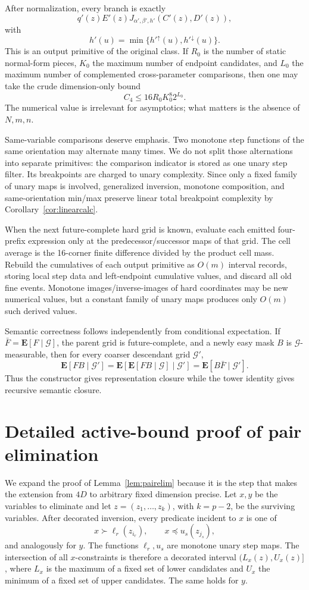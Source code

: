 \documentclass[12pt,a4paper]{article}
\theoremstyle{definition}
\newcommand{\E}{\mathbf E}
\newcommand{\1}{\mathbf 1}
\begin{document}
After normalization, every branch is exactly
\[
q'(z)E'(z)
J_{\alpha',\beta',h'}(C'(z),D'(z)),
\]
with
\[
h'(u)=\min\{h'^{\uparrow}(u),h'^{\downarrow}(u)\}.
\]
This is an output primitive of the original class.  If $R_0$ is the number of static normal-form pieces, $K_0$ the maximum number of endpoint candidates, and $L_0$ the maximum number of complemented cross-parameter comparisons, then one may take the crude dimension-only bound
\[
C_4\le 16R_0K_0^8 2^{L_0}.
\]
The numerical value is irrelevant for asymptotics; what matters is the absence of $N,m,n$.

Same-variable comparisons deserve emphasis.  Two monotone step functions of the same orientation may alternate many times.  We do not split those alternations into separate primitives: the comparison indicator is stored as one unary step filter.  Its breakpoints are charged to unary complexity.  Since only a fixed family of unary maps is involved, generalized inversion, monotone composition, and same-orientation min/max preserve linear total breakpoint complexity by Corollary~\ref{cor:linearcalc}.

When the next future-complete hard grid is known, evaluate each emitted four-prefix expression only at the predecessor/successor maps of that grid.  The cell average is the 16-corner finite difference divided by the product cell mass.  Rebuild the cumulatives of each output primitive as $O(m)$ interval records, storing local step data and left-endpoint cumulative values, and discard all old fine events.  Monotone images/inverse-images of hard coordinates may be new numerical values, but a constant family of unary maps produces only $O(m)$ such derived values.

Semantic correctness follows independently from conditional expectation.  If $\bar F=\E[F\mid\mathcal G]$, the parent grid is future-complete, and a newly easy mask $B$ is $\mathcal G$-measurable, then for every coarser descendant grid $\mathcal G'$,
\[
\E[FB\mid\mathcal G']
=\E[\E[FB\mid\mathcal G]\mid\mathcal G']
=\E[B\bar F\mid\mathcal G'].
\]
Thus the constructor gives representation closure while the tower identity gives recursive semantic closure.


\section{Detailed active-bound proof of pair elimination}        \label{app:pairelim}

We expand the proof of Lemma~\ref{lem:pairelim} because it is the step that makes the extension from $4D$ to arbitrary fixed dimension precise.  Let $x,y$ be the variables to eliminate and let $z=(z_1,\ldots,z_k)$, with $k=p-2$, be the surviving variables.  After decorated inversion, every predicate incident to $x$ is one of
\[
x\succ \ell_r(z_{i_r}),\qquad x\preceq u_s(z_{j_s}),
\]
and analogously for $y$.  The functions $\ell_r,u_s$ are monotone unary step maps.  The intersection of all $x$-constraints is therefore a decorated interval $(L_x(z),U_x(z)]$, where $L_x$ is the maximum of a fixed set of lower candidates and $U_x$ the minimum of a fixed set of upper candidates.  The same holds for $y$.
\end{document}
